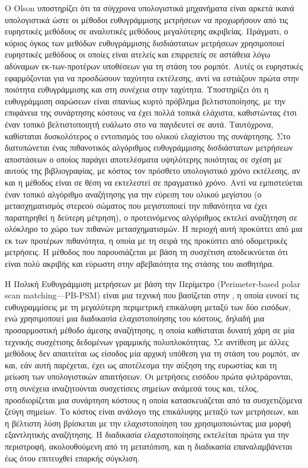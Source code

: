 Ο Olson \cite{Olson2009a} υποστηρίζει ότι τα σύγχρονα υπολογιστικά μηχανήματα
είναι αρκετά ικανά υπολογιστικά ώστε οι μέθοδοι ευθυγράμμισης μετρήσεων να
προχωρήσουν από τις ευρηστικές μεθόδους σε αναλυτικές μεθόδους μεγαλύτερης
ακριβείας. Πράγματι, ο κύριος όγκος των μεθόδων ευθυγράμμισης δισδιάστατων
μετρήσεων χρησιμοποιεί ευρηστικές μεθόδους οι οποίες είναι ατελείς και
επιρρεπείς σε αστάθεια λόγω αδύναμων εκ-των-προτέρων υποθέσεων για τη στάση του
ρομπότ. Αυτές οι ευρηστικές εφαρμόζονται για να προσδώσουν ταχύτητα εκτέλεσης,
αντί να εστιάζουν πρώτα στην ποιότητα ευθυγράμμισης και στη συνέχεια στην
ταχύτητα. Υποστηρίζει ότι η ευθυγράμμιση σαρώσεων είναι σπανίως κυρτό
πρόβλημα βελτιστοποίησης, με την επιφάνεια της συνάρτησης κόστους να έχει πολλά
τοπικά ελάχιστα, καθιστώντας έτσι έναν τοπικό βελτιστοποιητή ευάλωτο στο να
παγιδευτεί σε αυτά. Ταυτόχρονα, καθίσταται δυσκολότερος ο εντοπισμός του ολικού
ελαχίστου της συνάρτησης. Στο \cite{Olson2009a} διατυπώνεται ένας πιθανοτικός
αλγόριθμος ευθυγράμμισης δισδιάστατων μετρήσεων αποστάσεων ο οποίος παράγει
αποτελέσματα υψηλότερης ποιότητας σε σχέση με αυτούς της βιβλιογραφίας, με
κόστος τον πρόσθετο υπολογιστικό χρόνο εκτέλεσης, αν και η μέθοδος είναι σε
θέση να εκτελεστεί σε πραγματικό χρόνο. Αντί να εμπιστεύεται έναν τοπικό
αλγόριθμο αναζήτησης για την εύρεση του ολικού μεγίστου (ο μετασχηματισμός
στερεού σώματος που μεγιστοποιεί την πιθανότητα να έχει παρατηρηθεί η δεύτερη
μέτρηση), ο προτεινόμενος αλγόριθμος εκτελεί αναζήτηση σε ολόκληρο το χώρο των
πιθανών μετασχηματισμών. Η περιοχή αυτή προκύπτει από μια εκ των προτέρων
πιθανότητα, η οποία με τη σειρά της προκύπτει από οδομετρικές μετρήσεις. Η
μέθοδος που παρουσιάζεται με βάση τη συσχέτιση αποδεικνύεται ότι είναι πολύ
ακριβής και εύρωστη στην αβεβαιότητα της στάσης του αισθητήρα.

Η Πολική Ευθυγράμμιση μετρήσεων με βάση την Περίμετρο (Perimeter-based polar
scan matching---PB-PSM) \cite{Friedman2015} είναι μια τεχνική που βασίζεται
στην \cite{Diosi2005}, η οποία ευνοεί τις ευθυγραμμίσεις με τη μεγαλύτερη
περιμετρική επικάλυψη μεταξύ των δύο εισόδων, ενώ χρησιμοποιεί μια διαδικασία
ελαχιστοποίησης του κόστους, δηλαδή μια προσαρμοστική μέθοδο άμεσης αναζήτησης,
η οποία καθίσταται δυνατή χάρη σε μία τεχνικής συσχέτισης δεδομένων γραμμικής
πολυπλοκότητας. Σε αντίθεση με άλλες μεθόδους δεν απαιτείται ως είσοδος μία
αρχική υπόθεση για τη στάση του ρομπότ, αν και, εάν αυτή παρέχεται, έχει ως
αποτέλεσμα την αύξηση της ευρωστίας και τη μείωση των υπολογιστικών απαιτήσεων.
Οι μετρήσεις εισόδου πρώτα φιλτράρονται, στη συνέχεια αναζητούνται συσχετίσεις
σημείων ανάμεσά τους και, τέλος, προσδιορίζεται μια συνάρτηση κόστους η οποία
κατασκευάζεται από τα συσχετιζόμενα ζεύγη σημείων. Το κόστος είναι ανάλογο της
επικάλυψης μεταξύ των μετρήσεων, και η βέλτιστη λύση βρίσκεται με την
ελαχιστοποίηση του χρησιμοποιώντας μια μορφή εξαντλητικής αναζήτησης. Η
διαδικασία ελαχιστοποίησης εκτελείται πρώτα για την περιστροφή, ακολουθούμενη
από τη μετατόπιση, και η διαδικασία επαναλαμβάνεται έως ότου επιτευχθεί επαρκής
σύγκλιση.

